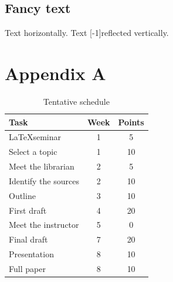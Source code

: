 \documentclass[11pt]{sigplanconf}
\begin{document}
\subsection{Fancy text}

Text  horizontally.
Text \scalebox{1}[-1]{reflected} vertically.




\section*{Appendix A}

\begin{table}[!htbp]
    \centering
    \begin{tabular}{|l|c|c|}
        \hline
        Task                 & Week & Points \\
        \hline
        \LaTeX seminar       & 1    & 5      \\
        Select a topic       & 1    & 10     \\
        Meet the librarian   & 2    & 5      \\
        Identify the sources & 2    & 10     \\
        Outline              & 3    & 10     \\
        First draft          & 4    & 20     \\
        Meet the instructor  & 5    & 0      \\
        Final draft          & 7    & 20     \\
        Presentation         & 8    & 10     \\
        Full paper           & 8    & 10     \\
        \hline
    \end{tabular}
    \caption{Tentative schedule}
    \label{tbl:schedule}
\end{table}
\end{document}
